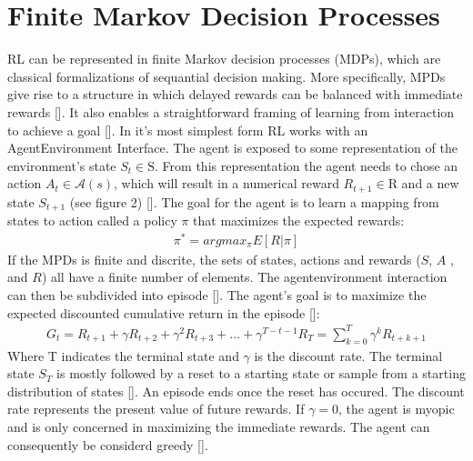 \documentclass[letterpaper,10pt,english]{jupyterBook}
\begin{document}
\section{Finite Markov Decision Processes}
\label{\detokenize{Reinforcement_learning:finite-markov-decision-processes}}
\sphinxAtStartPar
RL can be represented in finite Markov decision processes (MDPs), which are classical formalizations of sequantial decision making. More specifically, MPDs give rise to a structure in which delayed rewards can be balanced with immediate rewards {[}{]}. It also enables a straightforward framing of learning from interaction to achieve a goal {[}{]}. In it’s most simplest form RL works with an Agent\sphinxhyphen{}Environment Interface. The agent is exposed to some representation of the environment’s state \(S_t \in \mathrm{S}\). From this representation the agent needs to chose an action \( A_t \in \mathcal{A}(s)\), which will result in a numerical reward \(R_{t+1} \in \mathrm{R} \) and a new state \(S_{t+1}\) (see figure 2) {[}{]}. The goal for the agent is to learn a mapping from states to action called a policy \(\pi\) that maximizes the expected rewards:
\begin{equation*}
\begin{split} \pi^* = argmax_{\pi} E[R|\pi] \end{split}
\end{equation*}
\sphinxAtStartPar
If the MPDs is finite and discrite, the sets of states, actions and rewards (\(S\), \(A\) , and \(R\)) all have a finite number of elements. The agent\sphinxhyphen{}environment interaction can then be subdivided into episode {[}{]}.  The agent’s goal is to maximize the expected discounted cumulative return in the episode {[}{]}:
\begin{equation*}
\begin{split} G_t = R_{t+1} + \gamma R_{t+2} + \gamma^2 R_{t+3} + ... + \gamma^{T-t-1}R_T = \sum_{k=0}^T \gamma^k R_{t+k+1}\end{split}
\end{equation*}
\sphinxAtStartPar
Where T indicates the terminal state and \(\gamma\) is the discount rate. The terminal state \(S_T\) is mostly followed by a reset to a starting state or sample from a starting distribution of states {[}{]}. An episode ends once the reset has occured. The discount rate represents the present value of future rewards. If \(\gamma = 0\), the agent is myopic and is only concerned in maximizing the immediate rewards. The agent can consequently be considerd greedy {[}{]}.
\end{document}
